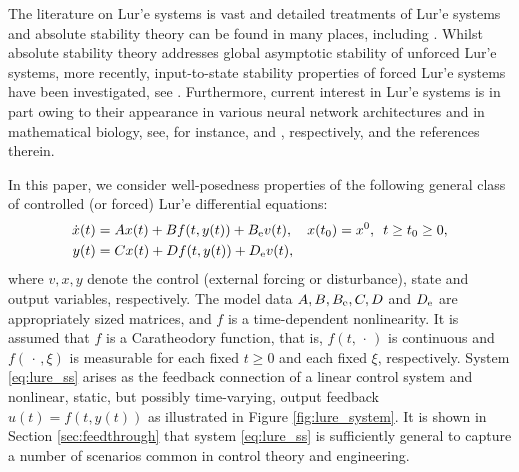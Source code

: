 \documentclass[a4paper,11pt]{article}
\numberwithin{equation}{section}
\numberwithin{figure}{section}
\numberwithin{table}{section}
\begin{document}
The literature on Lur'e systems
is vast and detailed treatments of Lur'e systems and absolute stability theory can be found in many places, including \cite{ag64,a13,blme20,dv75,g05,hc08,k02,nt73,v93}. Whilst absolute stability theory addresses global asymptotic stability of unforced Lur'e systems, more recently, input-to-state stability properties of forced Lur'e systems have been investigated, see \cite{at02,gl20,gl24,glo19,jlr09,jlr11,sl15}.
Furthermore, current interest in Lur'e systems is in part owing to their appearance in various neural network architectures and in mathematical biology, see, for instance, \cite{cgdrb23,dgt24,rwm20} and \cite{bglt16,fgl21,fglp19,st13}, respectively, and the references therein.

In this paper, we consider well-posedness properties of the following general class of controlled (or forced) Lur'e differential equations:
%
 \begin{subequations}\label{eq:lure_ss}
 \begin{align}
 \dot x(t) & = Ax(t)+ Bf(t,y(t)) + B_{\rm e}v(t),\quad x(t_0)=x^0,\,\,\,  t\geq t_0\geq 0,
 \label{eq:lure_ss_a}\\
 y(t) & = Cx(t)+Df(t,y(t))+ D_{\rm e}v(t),\label{eq:lure_ss_b}
 \end{align}
 \end{subequations}
where $v, x, y$ denote the control (external forcing or disturbance), state and output variables, respectively. The model data $A,B,B_{\rm e}, C, D$ and $D_{\rm e}$ are appropriately sized matrices, and $f$ is a time-dependent nonlinearity. It is assumed that $f$ is a Caratheodory
function, that is, $f(t,\,\cdot\,)$ is continuous and $f(\,\cdot\,,\xi)$ is measurable for
each fixed $t\geq 0$ and each fixed $\xi$, respectively.
System \eqref{eq:lure_ss} arises as the feedback connection of a linear control system and nonlinear, static, but possibly time-varying, output feedback $u(t)=
f(t,y(t))$ as illustrated in Figure \ref{fig:lure_system}. It is shown in Section
\ref{sec:feedthrough} that system \eqref{eq:lure_ss} is sufficiently general to capture a number of scenarios common in control theory and engineering.
%
\end{document}
